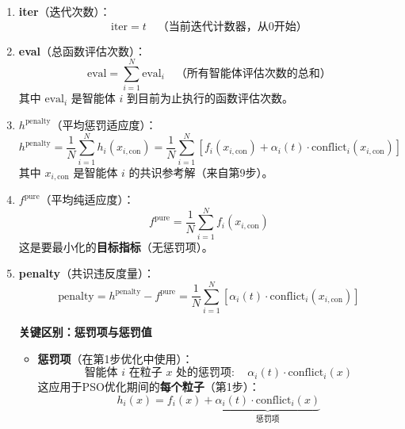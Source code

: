 \documentclass[11pt,a3paper]{ctexart}
\begin{document}
\begin{enumerate}
    \item \textbf{iter}（迭代次数）：
    \begin{equation}
    \text{iter} = t \quad \text{（当前迭代计数器，从0开始）}
    \end{equation}
    
    \item \textbf{eval}（总函数评估次数）：
    \begin{equation}
    \text{eval} = \sum_{i=1}^N \text{eval}_i \quad \text{（所有智能体评估次数的总和）}
    \end{equation}
    其中 $\text{eval}_i$ 是智能体 $i$ 到目前为止执行的函数评估次数。
    
    \item \textbf{$h^{\text{penalty}}$}（平均惩罚适应度）：
    \begin{equation}
    h^{\text{penalty}} = \frac{1}{N}\sum_{i=1}^N h_i(x_{i,\text{con}}) = \frac{1}{N}\sum_{i=1}^N \left[f_i(x_{i,\text{con}}) + \alpha_i(t) \cdot \text{conflict}_i(x_{i,\text{con}})\right]
    \end{equation}
    其中 $x_{i,\text{con}}$ 是智能体 $i$ 的共识参考解（来自第9步）。
    
    \item \textbf{$f^{\text{pure}}$}（平均纯适应度）：
    \begin{equation}
    f^{\text{pure}} = \frac{1}{N}\sum_{i=1}^N f_i(x_{i,\text{con}})
    \end{equation}
    这是要最小化的\textbf{目标指标}（无惩罚项）。
    
    \item \textbf{penalty}（共识违反度量）：
    \begin{equation}
    \text{penalty} = h^{\text{penalty}} - f^{\text{pure}} = \frac{1}{N}\sum_{i=1}^N \left[\alpha_i(t) \cdot \text{conflict}_i(x_{i,\text{con}})\right]
    \end{equation}
    
    \textbf{关键区别：惩罚项与惩罚值}
    
    \begin{itemize}
        \item \textbf{惩罚项}（在第1步优化中使用）：
        \begin{equation}
        \text{智能体 } i \text{ 在粒子 } x \text{ 处的惩罚项}: \quad \alpha_i(t) \cdot \text{conflict}_i(x)
        \end{equation}
        这应用于PSO优化期间的\textbf{每个粒子}（第1步）：
        \begin{equation}
        h_i(x) = f_i(x) + \underbrace{\alpha_i(t) \cdot \text{conflict}_i(x)}_{\text{惩罚项}}
        \end{equation}
        

\end{itemize}
\end{enumerate}
\end{document}

